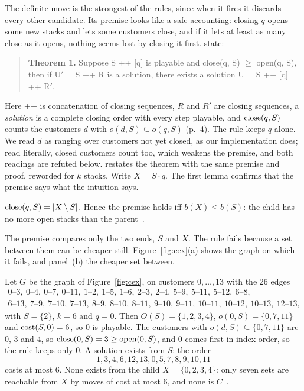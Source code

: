 The definite move is the strongest of the rules, since when it fires it
discards every other candidate. Its premise looks like a safe accounting:
closing $q$ opens some new stacks and lets some customers close, and if it
lets at least as many close as it opens, nothing seems lost by closing it
first. \citet[\S3.1, p.~6]{ChuStuckey2009} state:
\begin{quote}
\textbf{Theorem 1.} Suppose S ++ [q] is playable and close(q, S) $\ge$
open(q, S), then if U$'$ = S ++ R is a solution, there exists a solution
U = S ++ [q] ++ R$'$.
\end{quote}
Here ++ is concatenation of closing sequences, $R$ and $R'$ are closing
sequences, a \emph{solution} is a complete closing order with every step
playable, and $\mathrm{close}(q,S)$ counts the customers
$d$ with $o(d,S)\subseteq o(q,S)$ (p.~4). The rule keeps $q$ alone. We read $d$
as ranging over customers not yet closed, as our implementation does; read
literally, closed customers count too, which weakens the premise, and both
readings are refuted below. \citet[Thm~6.3.6, p.~142]{Chu2011} restates the
theorem with the same premise and proof, reworded for $k$ stacks. Write
$X=S\cdot q$. The first lemma confirms that the premise says what the
intuition says.

\begin{lemma}\label{lem:premise}
$\mathrm{close}(q,S)=|X\setminus S|$. Hence the premise holds iff $b(X)\le b(S)$: the
child has no more open stacks than the parent~.
\end{lemma}

The premise compares only the two ends, $S$ and $X$. The rule fails because a
set between them can be cheaper still. Figure~\ref{fig:cex}(a) shows the graph on
which it fails, and panel~(b) the cheaper set between.

\begin{counterexample}\label{cex:definite}
Let $G$ be the graph of Figure~\ref{fig:cex}, on customers $0,\dots,13$ with
the 26 edges
\begin{gather*}
0\text{--}3,\ 0\text{--}4,\ 0\text{--}7,\ 0\text{--}11,\ 1\text{--}2,\ 1\text{--}5,\ 1\text{--}6,\ 2\text{--}3,\ 2\text{--}4,\ 5\text{--}9,\ 5\text{--}11,\ 5\text{--}12,\ 6\text{--}8,\\
6\text{--}13,\ 7\text{--}9,\ 7\text{--}10,\ 7\text{--}13,\ 8\text{--}9,\ 8\text{--}10,\ 8\text{--}11,\ 9\text{--}10,\ 9\text{--}11,\ 10\text{--}11,\ 10\text{--}12,\ 10\text{--}13,\ 12\text{--}13,
\end{gather*}
with $S=\{2\}$, $k=6$ and $q=0$. Then $O(S)=\{1,2,3,4\}$,
$o(0,S)=\{0,7,11\}$ and $\mathrm{cost}(S,0)=6$, so $0$ is playable. The customers with
$o(d,S)\subseteq\{0,7,11\}$ are $0$, $3$ and $4$, so $\mathrm{close}(0,S)=3\ge\mathrm{open}(0,S)$,
and $0$ comes first in index order, so the rule keeps only $0$. A solution
exists from $S$: the order
\[1,3,4,6,12,13,0,5,7,8,9,10,11\]
costs at most 6. None exists from the child $X=\{0,2,3,4\}$: only seven sets
are reachable from $X$ by moves of cost at most 6, and none is $C$~.
\end{counterexample}


